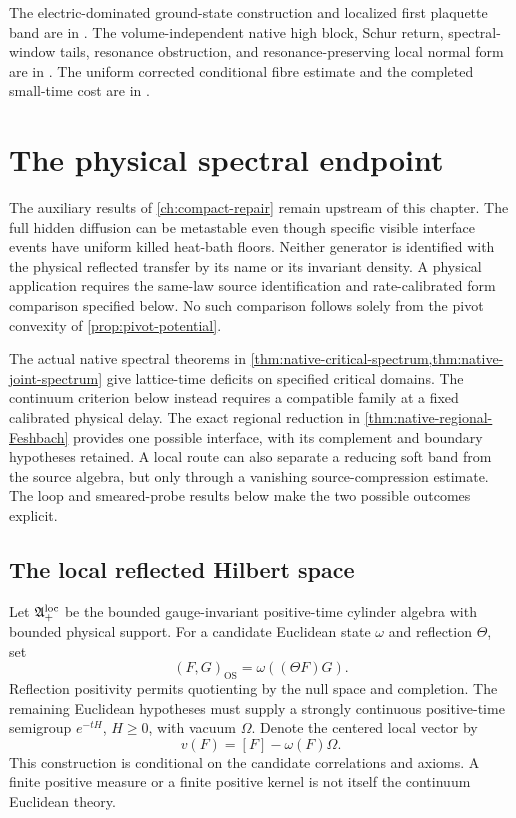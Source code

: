 \documentclass[11pt,oneside,openany]{book}
\theoremstyle{definition}
\theoremstyle{remark}
\newcommand{\OS}{\mathrm{OS}}
\newcommand{\src}[2]{\cite[#2]{#1}}
\newcommand{\sourcebasis}[1]{\par\smallskip\noindent #1\par}
\begin{document}
\sourcebasis{The electric-dominated ground-state construction and
localized first plaquette band are in \src{F18}{V5,V12}. The
volume-independent native high block, Schur return, spectral-window
tails, resonance obstruction, and resonance-preserving local normal
form are in \src{F17}{V99--V100}. The uniform corrected conditional
fibre estimate and the completed small-time cost are in
\src{F18}{V48--V49,V59}.}

\chapter{The physical spectral endpoint}
\label{ch:spectral}
The auxiliary results of \cref{ch:compact-repair} remain upstream of
this chapter. The full hidden diffusion can be metastable even though
specific visible interface events have uniform killed heat-bath floors.
Neither generator is identified with the physical reflected transfer by
its name or its invariant density. A physical application requires the
same-law source identification and rate-calibrated form comparison
specified below. No such comparison follows solely from the pivot
convexity of \cref{prop:pivot-potential}.

The actual native spectral theorems in
\cref{thm:native-critical-spectrum,thm:native-joint-spectrum} give
lattice-time deficits on specified critical domains. The continuum
criterion below instead requires a compatible family at a fixed
calibrated physical delay. The exact regional reduction in
\cref{thm:native-regional-Feshbach} provides one possible interface,
with its complement and boundary hypotheses retained. A local route
can also separate a reducing soft band from the source algebra, but
only through a vanishing source-compression estimate. The loop and
smeared-probe results below make the two possible outcomes explicit.

\section{The local reflected Hilbert space}
Let $\mathfrak A_+^{\rm loc}$ be the bounded gauge-invariant positive-time cylinder algebra with bounded physical support. For a candidate Euclidean state $\omega$ and reflection $\Theta$, set
\[
(F,G)_{\OS}=\omega((\Theta F)G).
\]
Reflection positivity permits quotienting by the null space and completion. The remaining Euclidean hypotheses must supply a strongly continuous positive-time semigroup $e^{-tH}$, $H\ge0$, with vacuum $\Omega$. Denote the centered local vector by
\[
v(F)=[F]-\omega(F)\Omega.
\]
This construction is conditional on the candidate correlations and axioms. A finite positive measure or a finite positive kernel is not itself the continuum Euclidean theory.
\end{document}
